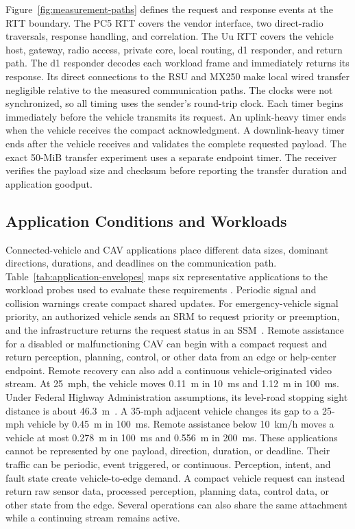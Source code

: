 Figure~\ref{fig:measurement-paths} defines the request and response events at
the RTT boundary. The PC5 RTT covers the vendor
interface, two direct-radio traversals, response handling, and correlation. The
Uu RTT covers the vehicle host, gateway, radio access, private core, local
routing, d1 responder, and return path. The d1
responder decodes each workload frame and immediately returns its response.
Its direct connections to the RSU and MX250 make local wired transfer
negligible relative to the measured communication paths. The clocks were not
synchronized, so all timing uses the sender's round-trip clock. Each timer
begins immediately before the vehicle transmits its request. An uplink-heavy
timer ends when the vehicle receives the compact acknowledgment. A
downlink-heavy timer ends after the vehicle receives and validates the complete
requested payload.
The exact 50-MiB transfer experiment uses a separate endpoint timer. The
receiver verifies the payload size and checksum before reporting the
transfer duration and application goodput.

\subsection{Application Conditions and Workloads}

Connected-vehicle and CAV applications place different data sizes, dominant
directions, durations, and deadlines on the communication path.
Table~\ref{tab:application-envelopes} maps six representative applications to
the workload probes used to evaluate these requirements
\cite{nhtsa2005vsc,etsi122186r19,fivegaa2021usecases,he2024transformative}.
Periodic signal and collision warnings create compact shared updates. For
emergency-vehicle signal priority, an authorized vehicle sends an SRM to
request priority or preemption, and the infrastructure returns the request
status in an SSM~\cite{saej2735_2024}. Remote assistance for a disabled or
malfunctioning CAV can begin with a compact request and return perception,
planning, control, or other data from an edge or help-center endpoint. Remote
recovery can also add a continuous vehicle-originated video stream. At
25~mph, the vehicle moves 0.11~m in 10~ms and 1.12~m in 100~ms. Under Federal
Highway Administration assumptions, its level-road stopping sight distance is
about 46.3~m~\cite{fhwa2009speed}. A 35-mph adjacent vehicle changes its gap to
a 25-mph vehicle by 0.45~m in 100~ms. Remote assistance below 10~km/h moves a
vehicle at most 0.278~m in 100~ms and 0.556~m in 200~ms. These applications
cannot be represented by one payload, direction, duration, or deadline.
Their traffic can be periodic, event triggered, or continuous. Perception,
intent, and fault state create vehicle-to-edge demand. A compact vehicle
request can instead return raw sensor data, processed perception, planning
data, control data, or other state from the edge. Several operations can also
share the same attachment while a continuing stream remains active.

